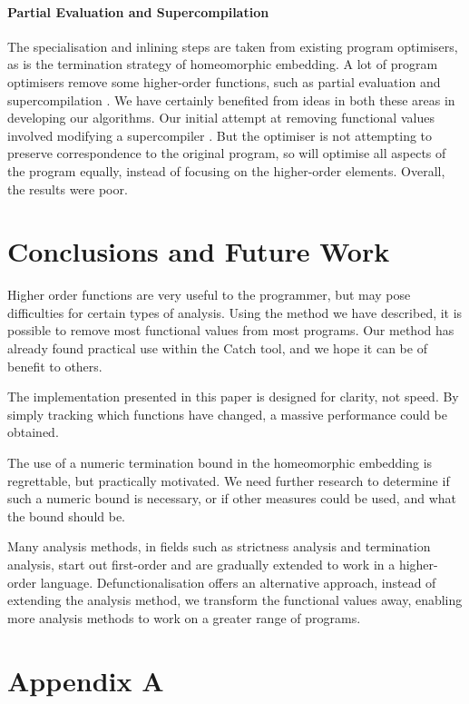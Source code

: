 \documentclass[preprint]{sigplanconf}
\begin{document}
\paragraph{Partial Evaluation and Supercompilation}

The specialisation and inlining steps are taken from existing program optimisers, as is the termination strategy of homeomorphic embedding. A lot of program optimisers remove some higher-order functions, such as partial evaluation \cite{jones:partial_evaluation} and supercompilation \cite{supercompilation}. We have certainly benefited from ideas in both these areas in developing our algorithms. Our initial attempt at removing functional values involved modifying a supercompiler \cite{me:supero}. But the optimiser is not attempting to preserve correspondence to the original program, so will optimise all aspects of the program equally, instead of focusing on the higher-order elements. Overall, the results were poor.

\section{Conclusions and Future Work}
\label{sec:conclusion}

Higher order functions are very useful to the programmer, but may pose difficulties for certain types of analysis. Using the method we have described, it is possible to remove most functional values from most programs. Our method has already found practical use within the Catch tool, and we hope it can be of benefit to others.

The implementation presented in this paper is designed for clarity, not speed. By simply tracking which functions have changed, a massive performance could be obtained.

The use of a numeric termination bound in the homeomorphic embedding is regrettable, but practically motivated. We need further research to determine if such a numeric bound is necessary, or if other measures could be used, and what the bound should be.

Many analysis methods, in fields such as strictness analysis and termination analysis, start out first-order and are gradually extended to work in a higher-order language. Defunctionalisation offers an alternative approach, instead of extending the analysis method, we transform the functional values away, enabling more analysis methods to work on a greater range of programs.

\section*{Appendix A}
\end{document}

